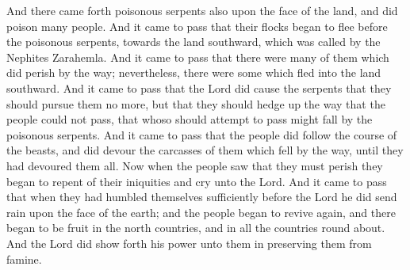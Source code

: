 \bverse \iffalse And there came forth poisonous serpents also upon the face of the land, and did poison many people. And it came to pass that their flocks began to flee before the poisonous serpents, towards the land southward, which was called by the Nephites Zarahemla. \fi
And there came forth poisonous serpents also upon the face of the land, and did poison many people. And it came to pass that their flocks began to flee before the poisonous serpents, towards the land southward, which was called by the Nephites Zarahemla.
\bverse \iffalse And it came to pass that there were many of them which did perish by the way; nevertheless, there were some which fled into the land southward. \fi
And it came to pass that there were many of them which did perish by the way; nevertheless, there were some which fled into the land southward.
\bverse \iffalse And it came to pass that the Lord did cause the serpents that they should pursue them no more, but that they should hedge up the way that the people could not pass, that whoso should attempt to pass might fall by the poisonous serpents. \fi
And it came to pass that the Lord did cause the serpents that they should pursue them no more, but that they should hedge up the way that the people could not pass, that whoso should attempt to pass might fall by the poisonous serpents.
\bverse \iffalse And it came to pass that the people did follow the course of the beasts, and did devour the carcasses of them which fell by the way, until they had devoured them all. Now when the people saw that they must perish they began to repent of their iniquities and cry unto the Lord. \fi
And it came to pass that the people did follow the course of the beasts, and did devour the carcasses of them which fell by the way, until they had devoured them all. Now when the people saw that they must perish they began to repent of their iniquities and cry unto the Lord.
\bverse \iffalse And it came to pass that when they had humbled themselves sufficiently before the Lord he did send rain upon the face of the earth; and the people began to revive again, and there began to be fruit in the north countries, and in all the countries round about. And the Lord did show forth his power unto them in preserving them from famine. \fi
And it came to pass that when they had humbled themselves sufficiently before the Lord he did send rain upon the face of the earth; and the people began to revive again, and there began to be fruit in the north countries, and in all the countries round about. And the Lord did show forth his power unto them in preserving them from famine.

